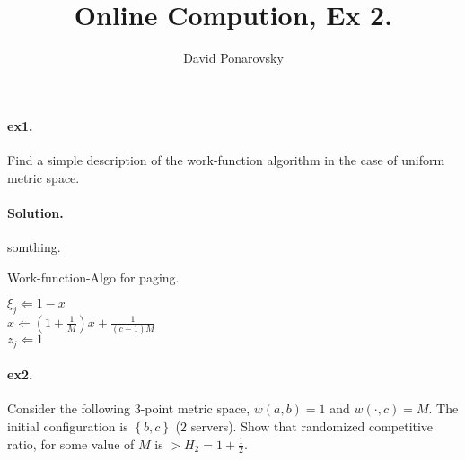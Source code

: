 \documentclass{article}
\newcommand{\expp}[1]{ \mathbf{E} \left[ {#1} \right]}
\begin{document}
\newcommand{\dalg}[1]{\expp{#1 : \text{alg} \sim \tilde{\text{alg}}}}
\newcommand{\dsig}[1]{\expp{#1 : \sigma \sim \tilde{\sigma}}}
\newcommand{\calg}{c_{\text{alg}}}
\newcommand{\cbase}{c_{\text{base}}}


\title{Online Compution, Ex 2. } 
\author{David Ponarovsky}
\maketitle
\begin{multicols*}{2}
  \paragraph{ex1.} Find a simple description of the work-function algorithm in the case of uniform metric space. 
  \paragraph{Solution.} somthing.

\begin{algorithm}[H]
  \caption{Work-function-Algo for paging.}
    \label{alg:three}
     {
       { 
	$ \xi_{j} \Leftarrow 1 - x$ \\
	$ x \Leftarrow \left( 1 + \frac{1}{M} \right) x + \frac{1}{\left( c - 1  \right) M } $ \\
	$ z_{j} \Leftarrow 1$
      }
    }
  \end{algorithm}
  \paragraph{ex2.} Consider the following $3$-point metric space, $w\left( a,b \right) = 1 $ and $w\left( \cdot, c  \right) = M $. The initial configuration is $ \left\{ b,c \right\}$ ($2$ servers). Show that randomized competitive ratio, for some value of $M$ is $ > H_{2} = 1 + \frac{1}{2}$. 

\end{multicols*}
\end{document}

